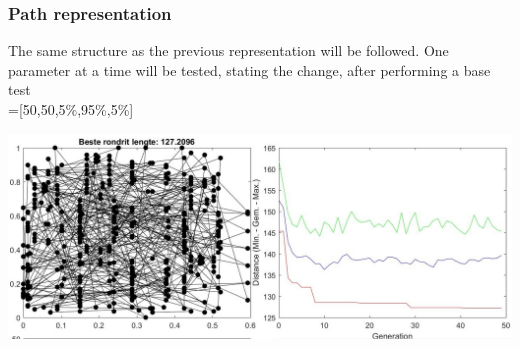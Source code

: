 \subsubsection{Path representation}

The same structure as the previous representation will be followed. One
parameter at a time will be tested, stating the change, after
performing a base test
\\
 =[50,50,5\%,95\%,5\%]

\includegraphics[width=\textwidth]{img/specific/order_crossover/general_1.jpg}


